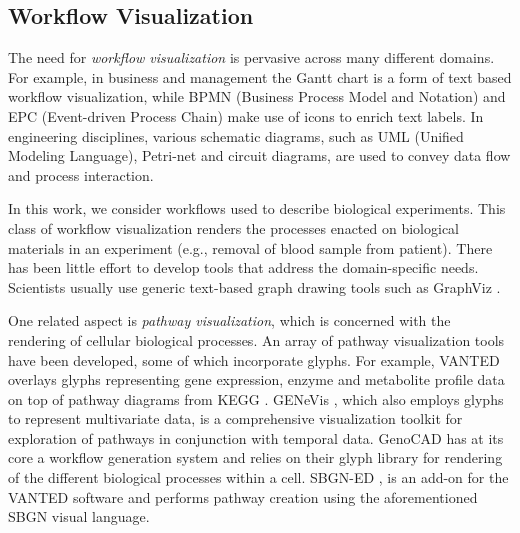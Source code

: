 
\subsection{Workflow Visualization}
%
The need for \emph{workflow visualization} is pervasive across many different domains.
For example, in business and management the Gantt chart is a form of text based workflow visualization, while BPMN (Business Process Model and Notation) and EPC (Event-driven Process Chain) make use of icons to enrich text labels.
In engineering disciplines, various schematic diagrams, such as UML (Unified Modeling Language), Petri-net and circuit diagrams, are used to convey data flow and process interaction.

In this work, we consider workflows used to describe biological experiments. 
This class of workflow visualization renders the processes enacted on biological materials in an experiment (e.g., removal of blood sample from patient).
There has been little effort to develop tools that address the domain-specific needs.
Scientists usually use generic text-based graph drawing tools such as GraphViz \cite{graphviz}.

One related aspect is \emph{pathway visualization}, which is concerned with the rendering of cellular biological processes. An array of pathway visualization tools have been developed, some of which incorporate glyphs.
For example, VANTED \cite{junker06} overlays glyphs representing gene expression, enzyme and metabolite profile data on top of pathway diagrams from KEGG \cite{ogata99}.
GENeVis \cite{bourqui09}, which also employs glyphs to represent multivariate data, is a comprehensive visualization toolkit for exploration of pathways in conjunction with temporal data.
GenoCAD has at its core a workflow generation system and relies on their glyph library for rendering of the different biological processes within a cell.
SBGN-ED \cite{czauderna10}, is an add-on for the VANTED software and performs pathway creation using the aforementioned SBGN \cite{lenovere09} visual language.



